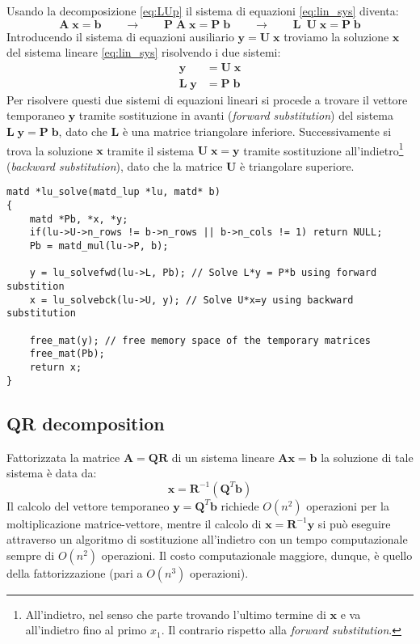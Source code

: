 \documentclass[10pt]{article}
\begin{document}
Usando la decomposizione \eqref{eq:LUp} il sistema di equazioni \eqref{eq:lin_sys} diventa:
\begin{equation}
\mathbf{A} \; \mathbf{x} = \mathbf{b}
\qquad \rightarrow \qquad
\mathbf{P} \; \mathbf{A} \; \mathbf{x} = \mathbf{P} \; \mathbf{b}
\qquad \rightarrow \qquad
\mathbf{L}\ \; \mathbf{U} \; \mathbf{x} = \mathbf{P} \; \mathbf{b}
\end{equation}
Introducendo il sistema di equazioni ausiliario $\mathbf{y} = \mathbf{U} \; \mathbf{x}$ troviamo la soluzione $\mathbf{x}$ del sistema lineare \eqref{eq:lin_sys} risolvendo i due sistemi:
\begin{align}
\mathbf{y} & = \mathbf{U} \; \mathbf{x} \\
\mathbf{L} \; \mathbf{y} & = \mathbf{P} \; \mathbf{b}
\end{align}
Per risolvere questi due sistemi di equazioni lineari si procede a trovare il vettore temporaneo $\mathbf{y}$ tramite sostituzione in avanti (\textit{forward substitution}) del sistema $\mathbf{L} \; \mathbf{y} = \mathbf{P} \; \mathbf{b}$, dato che $\mathbf{L}$ è una matrice triangolare inferiore. Successivamente si trova la soluzione $\mathbf{x}$ tramite il sistema $\mathbf{U} \; \mathbf{x} = \mathbf{y}$ tramite sostituzione all'indietro\footnote{All'indietro, nel senso che parte trovando l'ultimo termine di $\mathbf{x}$ e va all'indietro fino al primo $x_1$. Il contrario rispetto alla \textit{forward substitution}.} (\textit{backward substitution}), dato che la matrice $\mathbf{U}$ è triangolare superiore.

\begin{lstlisting}
matd *lu_solve(matd_lup *lu, matd* b)
{
	matd *Pb, *x, *y;
	if(lu->U->n_rows != b->n_rows || b->n_cols != 1) return NULL;
	Pb = matd_mul(lu->P, b);
	
	y = lu_solvefwd(lu->L, Pb); // Solve L*y = P*b using forward substition
	x = lu_solvebck(lu->U, y); // Solve U*x=y using backward substitution
	
	free_mat(y); // free memory space of the temporary matrices	
	free_mat(Pb);
	return x;
}
\end{lstlisting}




\subsection{QR decomposition}

Fattorizzata la matrice $\mathbf{A}=\mathbf{Q}\mathbf{R}$ di un sistema lineare $\mathbf{A}\mathbf{x}=\mathbf{b}$ la soluzione di tale sistema è data da:
\begin{equation}
\mathbf{x} = \mathbf{R}^{-1} (\mathbf{Q}^T \mathbf{b})
\end{equation}
Il calcolo del vettore temporaneo $\mathbf{y} = \mathbf{Q}^T \mathbf{b}$ richiede $O(n^2)$ operazioni per la moltiplicazione matrice-vettore, mentre il calcolo di $\mathbf{x}=\mathbf{R}^{-1}\mathbf{y}$ si può eseguire attraverso un algoritmo di sostituzione all'indietro con un tempo computazionale sempre di $O(n^2)$ operazioni. Il costo computazionale maggiore, dunque, è quello della fattorizzazione (pari a $O(n^3)$ operazioni).
\end{document}

